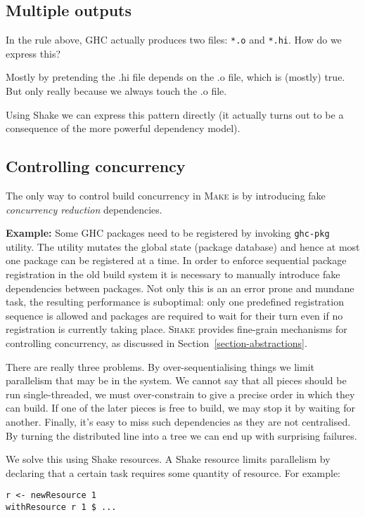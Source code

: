 \subsection{Multiple outputs}

In the rule above, GHC actually produces two files: \texttt{*.o} and \texttt{*.hi}. How do we express this?

Mostly by pretending the .hi file depends on the .o file, which is (mostly) true. But only really because we always touch the .o file.

Using Shake we can express this pattern directly (it actually turns out to be a consequence of the more powerful dependency model).

\subsection{Controlling concurrency}
The only way to control build concurrency in \textsc{Make} is by introducing
fake \emph{concurrency reduction} dependencies.

\textbf{Example:} Some GHC packages need to be registered by invoking
\texttt{ghc-pkg} utility. The utility mutates the global state (package
database) and hence at most one package can be registered at a time. In order to
enforce sequential package registration in the old build system it is necessary
to manually introduce fake dependencies between packages. Not only this is an
an error prone and mundane task, the resulting performance is suboptimal: only
one predefined registration sequence is allowed and packages are required to
wait for their turn even if no registration is currently taking place.
\textsc{Shake} provides fine-grain mechanisms for controlling concurrency, as
discussed in Section~\ref{section-abstractions}.

There are really three problems. By over-sequentialising things we limit parallelism that may be in the system. We cannot say that all pieces should be run single-threaded, we must over-constrain to give a precise order in which they can build. If one of the later pieces is free to build, we may stop it by waiting for another. Finally, it's easy to miss such dependencies as they are not centralised. By turning the distributed line into a tree we can end up with surprising failures.

We solve this using Shake resources. A Shake resource limits parallelism by declaring that a certain task requires some quantity of resource. For example:

\begin{verbatim}
r <- newResource 1
withResource r 1 $ ...
\end{verbatim}

